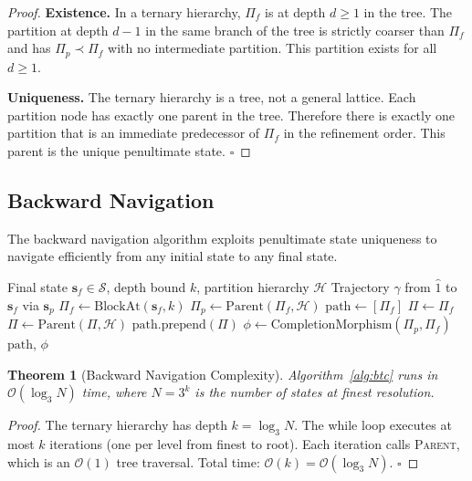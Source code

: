 \documentclass[12pt,twocolumn]{article}
\newtheorem{theorem}{Theorem}[section]
\begin{document}
\begin{proof}
\textbf{Existence.} In a ternary hierarchy, $\Pi_f$ is at depth $d \geq 1$ in the tree. The partition at depth $d-1$ in the same branch of the tree is strictly coarser than $\Pi_f$ and has $\Pi_p \prec \Pi_f$ with no intermediate partition. This partition exists for all $d \geq 1$.

\textbf{Uniqueness.} The ternary hierarchy is a tree, not a general lattice. Each partition node has exactly one parent in the tree. Therefore there is exactly one partition that is an immediate predecessor of $\Pi_f$ in the refinement order. This parent is the unique penultimate state. $\square$
\end{proof}

\subsection{Backward Navigation}

The backward navigation algorithm exploits penultimate state uniqueness to navigate efficiently from any initial state to any final state.

\begin{algorithm}[H]
\caption{Backward Trajectory Completion}
\label{alg:btc}
\begin{algorithmic}[1]
\Require Final state $\mathbf{s}_f \in \mathcal{S}$, depth bound $k$, partition hierarchy $\mathcal{H}$
\Ensure Trajectory $\gamma$ from $\hat{1}$ to $\mathbf{s}_f$ via $\mathbf{s}_p$
\State $\Pi_f \leftarrow \text{BlockAt}(\mathbf{s}_f, k)$ 
\State $\Pi_p \leftarrow \text{Parent}(\Pi_f, \mathcal{H})$ 
\State $\text{path} \leftarrow [\Pi_f]$
\State $\Pi \leftarrow \Pi_f$
 
  \State $\Pi \leftarrow \text{Parent}(\Pi, \mathcal{H})$
  \State $\text{path.prepend}(\Pi)$
\EndWhile
\State $\phi \leftarrow \text{CompletionMorphism}(\Pi_p, \Pi_f)$
\Return $\text{path}$, $\phi$
\end{algorithmic}
\end{algorithm}

\begin{theorem}[Backward Navigation Complexity]
\label{thm:nav_complexity}
Algorithm~\ref{alg:btc} runs in $\mathcal{O}(\log_3 N)$ time, where $N = 3^k$ is the number of states at finest resolution.
\end{theorem}

\begin{proof}
The ternary hierarchy has depth $k = \log_3 N$. The while loop executes at most $k$ iterations (one per level from finest to root). Each iteration calls \textsc{Parent}, which is an $\mathcal{O}(1)$ tree traversal. Total time: $\mathcal{O}(k) = \mathcal{O}(\log_3 N)$. $\square$
\end{proof}
\end{document}

